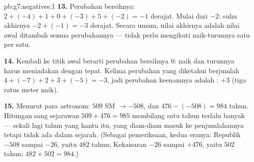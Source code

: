 \begin{solution}{pb:g7:negatives:1}
\textbf{13.} Perubahan bersihnya:
$2 + (-4) + 1 + 0 + (-3) + 5 + (-2) = -1$ derajat. Mulai dari
$-2$: suhu akhirnya $-2 + (-1) = -3$ derajat. Secara umum,
nilai akhirnya adalah nilai awal ditambah  semua
perubahannya --- tidak perlu mengikuti naik-turunnya satu per satu.

\textbf{14.} Kembali ke titik awal berarti perubahan bersihnya $0$:
naik dan turunnya harus meniadakan dengan tepat. Kelima perubahan
yang diketahui berjumlah $4 + (-7) + 2 + 3 + (-5) = -3$, jadi
perubahan keenamnya adalah : $+3$ (tiga ratus meter naik).

\textbf{15.} Menurut para astronom: $509$ SM $\to -508$, dan
$476 - (-508) = 984$ tahun. Hitungan sang sejarawan
$509 + 476 = 985$ membilang satu tahun terlalu banyak --- sekali lagi
tahun  yang hantu itu, yang diam-diam masuk ke penjumlahannya
tetapi tidak ada dalam sejarah. (Sebagai pemeriksaan, kedua eranya:
Republik $-508$ sampai $-26$, yaitu $482$ tahun; Kekaisaran $-26$
sampai $+476$, yaitu $502$ tahun; $482 + 502 = 984$.)

\end{solution}
